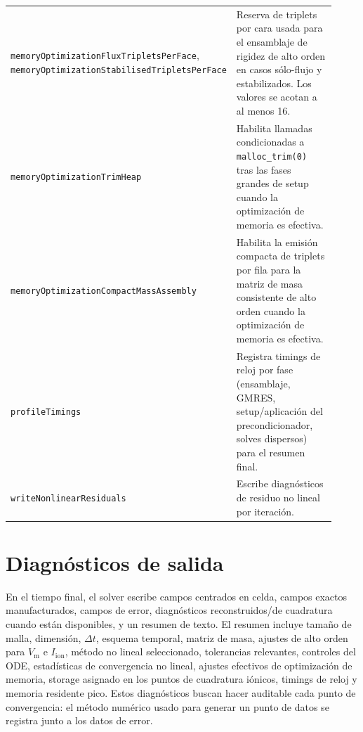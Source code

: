 \documentclass[11pt,a4paper]{article}
\newcommand{\code}[1]{\texttt{\small #1}}
\newcommand{\Vm}{V_{\text{m}}}
\newcommand{\Iion}{I_{\mathrm{ion}}}
\begin{document}
\begin{longtable}{@{}p{0.34\linewidth}p{0.58\linewidth}@{}}
\code{memoryOptimizationFluxTripletsPerFace}, \code{memoryOptimizationStabilisedTripletsPerFace} & Reserva de triplets por cara usada para el ensamblaje de rigidez de alto orden en casos sólo-flujo y estabilizados. Los valores se acotan a al menos 16. \\
\code{memoryOptimizationTrimHeap} & Habilita llamadas condicionadas a \code{malloc\_trim(0)} tras las fases grandes de setup cuando la optimización de memoria es efectiva. \\
\code{memoryOptimizationCompactMassAssembly} & Habilita la emisión compacta de triplets por fila para la matriz de masa consistente de alto orden cuando la optimización de memoria es efectiva. \\
\code{profileTimings} & Registra timings de reloj por fase (ensamblaje, GMRES, setup/aplicación del precondicionador, solves dispersos) para el resumen final. \\
\code{writeNonlinearResiduals} & Escribe diagnósticos de residuo no lineal por iteración. \\
\bottomrule
\end{longtable}

\section{Diagnósticos de salida}

En el tiempo final, el solver escribe campos centrados en celda, campos exactos
manufacturados, campos de error, diagnósticos reconstruidos/de cuadratura cuando están
disponibles, y un resumen de texto. El resumen incluye tamaño de malla, dimensión, $\Delta t$,
esquema temporal, matriz de masa, ajustes de alto orden para $\Vm$ e $\Iion$, método no lineal
seleccionado, tolerancias relevantes, controles del ODE, estadísticas de convergencia no
lineal, ajustes efectivos de optimización de memoria, storage asignado en los puntos de
cuadratura iónicos, timings de reloj y memoria residente pico. Estos diagnósticos buscan hacer
auditable cada punto de convergencia: el método numérico usado para generar un punto de datos
se registra junto a los datos de error.
\end{document}
